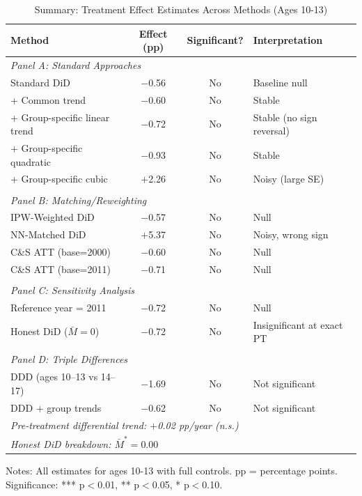 \documentclass[12pt]{article}
\begin{document}
\begin{table}[H]
\centering
\caption{Summary: Treatment Effect Estimates Across Methods (Ages 10-13)}
\label{tab:summary_methods}
\begin{threeparttable}
\begin{tabular}{lccl}
\toprule
Method & Effect (pp) & Significant? & Interpretation \\
\midrule
\multicolumn{4}{l}{\textit{Panel A: Standard Approaches}} \\
Standard DiD & $-$0.56 & No & Baseline null \\
+ Common trend & $-$0.60 & No & Stable \\
+ Group-specific linear trend & $-$0.72 & No & Stable (no sign reversal) \\
+ Group-specific quadratic & $-$0.93 & No & Stable \\
+ Group-specific cubic & $+$2.26 & No & Noisy (large SE) \\
\\
\multicolumn{4}{l}{\textit{Panel B: Matching/Reweighting}} \\
IPW-Weighted DiD & $-$0.57 & No & Null \\
NN-Matched DiD & $+$5.37 & No & Noisy, wrong sign \\
C\&S ATT (base=2000) & $-$0.60 & No & Null \\
C\&S ATT (base=2011) & $-$0.71 & No & Null \\
\\
\multicolumn{4}{l}{\textit{Panel C: Sensitivity Analysis}} \\
Reference year = 2011 & $-$0.72 & No & Null \\
Honest DiD ($\bar{M}=0$) & $-$0.72 & No & Insignificant at exact PT \\
\\
\multicolumn{4}{l}{\textit{Panel D: Triple Differences}} \\
DDD (ages 10--13 vs 14--17) & $-$1.69 & No & Not significant \\
DDD + group trends & $-$0.62 & No & Not significant \\
\midrule
\multicolumn{4}{l}{\textit{Pre-treatment differential trend: $+$0.02 pp/year (n.s.)}} \\
\multicolumn{4}{l}{\textit{Honest DiD breakdown: $\bar{M}^* = 0.00$}} \\
\bottomrule
\end{tabular}
\begin{tablenotes}
\footnotesize
\item Notes: All estimates for ages 10-13 with full controls. pp = percentage points. Significance: *** p$<$0.01, ** p$<$0.05, * p$<$0.10.
\end{tablenotes}
\end{threeparttable}
\end{table}
\end{document}
